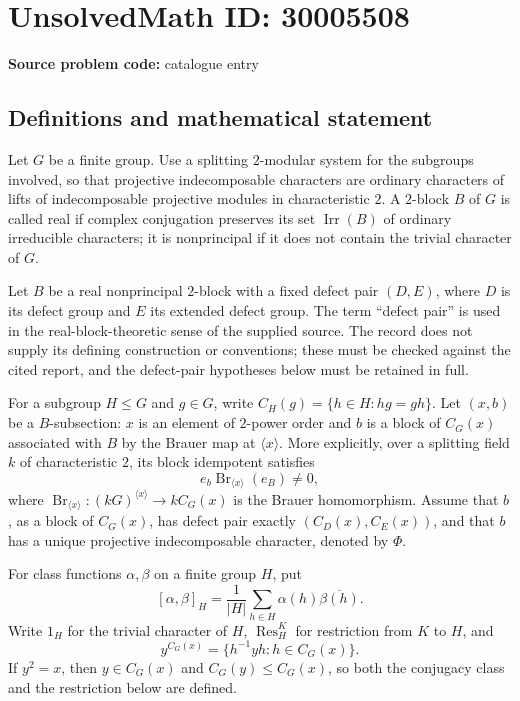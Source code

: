 \documentclass[11pt]{article}
\begin{document}
\section*{UnsolvedMath ID: 30005508}
\textbf{Source problem code:} catalogue entry
\subsection{Definitions and mathematical statement}
Let \(G\) be a finite group. Use a splitting \(2\)-modular system for the subgroups involved, so that projective indecomposable characters are ordinary characters of lifts of indecomposable projective modules in characteristic \(2\). A \(2\)-block \(B\) of \(G\) is called real if complex conjugation preserves its set \(\operatorname{Irr}(B)\) of ordinary irreducible characters; it is nonprincipal if it does not contain the trivial character of \(G\).

Let \(B\) be a real nonprincipal \(2\)-block with a fixed defect pair \((D,E)\), where \(D\) is its defect group and \(E\) its extended defect group. The term ``defect pair'' is used in the real-block-theoretic sense of the supplied source. The record does not supply its defining construction or conventions; these must be checked against the cited report, and the defect-pair hypotheses below must be retained in full.

For a subgroup \(H\leq G\) and \(g\in G\), write \(C_H(g)=\{h\in H:hg=gh\}\). Let \((x,b)\) be a \(B\)-subsection: \(x\) is an element of \(2\)-power order and \(b\) is a block of \(C_G(x)\) associated with \(B\) by the Brauer map at \(\langle x\rangle\). More explicitly, over a splitting field \(k\) of characteristic \(2\), its block idempotent satisfies
\[
 e_b\operatorname{Br}_{\langle x\rangle}(e_B)\ne 0,
\]
where \(\operatorname{Br}_{\langle x\rangle}:(kG)^{\langle x\rangle}\longrightarrow kC_G(x)\) is the Brauer homomorphism. Assume that \(b\), as a block of \(C_G(x)\), has defect pair exactly \((C_D(x),C_E(x))\), and that \(b\) has a unique projective indecomposable character, denoted by \(\Phi\).

For class functions \(\alpha,\beta\) on a finite group \(H\), put
\[
 [\alpha,\beta]_H=\frac{1}{|H|}\sum_{h\in H}\alpha(h)\overline{\beta(h)}.
\]
Write \(1_H\) for the trivial character of \(H\), \(\operatorname{Res}^{K}_{H}\) for restriction from \(K\) to \(H\), and
\[
 y^{C_G(x)}=\{h^{-1}yh:h\in C_G(x)\}.
\]
If \(y^2=x\), then \(y\in C_G(x)\) and \(C_G(y)\leq C_G(x)\), so both the conjugacy class and the restriction below are defined.
\end{document}
